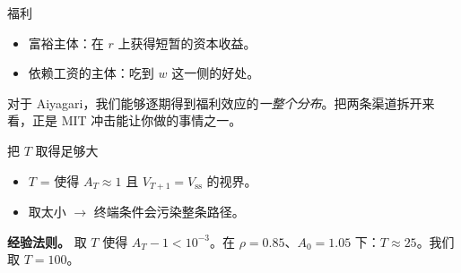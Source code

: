 \documentclass[10pt,aspectratio=169]{beamer}
\begin{document}
\begin{frame}{福利}

\begin{itemize}
  \item 富裕主体：在 $r$ 上获得短暂的资本收益。
  \item 依赖工资的主体：吃到 $w$ 这一侧的好处。
\end{itemize}

\vspace{0.6em}

对于 Aiyagari，我们能够逐期得到福利效应的\emph{一整个分布}。把两条渠道拆开来看，正是 MIT 冲击能让你做的事情之一。

\end{frame}

\begin{frame}{把 $T$ 取得足够大}

\begin{itemize}
  \item $T$ = 使得 $A_T \approx 1$ 且 $V_{T+1} = V_{\mathrm{ss}}$ 的视界。
  \item 取太小 $\to$ 终端条件会污染整条路径。
\end{itemize}

\vspace{0.4em}

\textbf{经验法则。} 取 $T$ 使得 $A_T - 1 < 10^{-3}$。在 $\rho = 0.85$、$A_0 = 1.05$ 下：$T \approx 25$。我们取 $T = 100$。

\end{frame}
\end{document}
